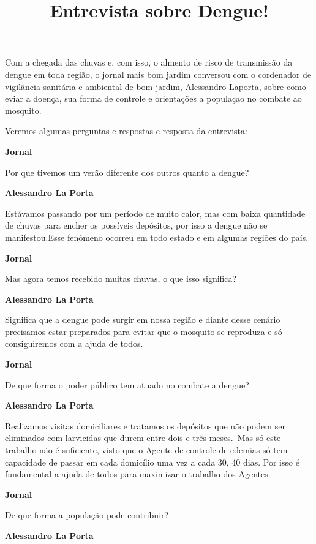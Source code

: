 \documentclass[12pt]{memoir}
\newenvironment{Entrevista}{%
  \par\bigskip\noindent\textbf{Jornal}\par}{%
  \par\smallskip\noindent\textbf{Alessandro La Porta}\par}
\begin{document}
\title{Entrevista sobre Dengue!}
\maketitle

Com a chegada das chuvas e, com isso, o almento de risco de transmissão  da dengue em toda região,  o jornal mais bom jardim conversou com o cordenador de vigilância sanitária e ambiental de bom jardim, Alessandro Laporta, sobre como eviar a doença, sua forma de controle e orientações a populaçao no combate ao mosquito.\\\par
Veremos algumas perguntas e respostas e resposta da entrevista:\\\par


\begin{Entrevista}
Por que tivemos um verão diferente dos outros quanto a dengue?
\end{Entrevista}

Estávamos passando por um período de muito calor, mas com baixa quantidade de chuvas para encher os possíveis depósitos, por isso a dengue não se manifestou.\@ Esse fenômeno ocorreu em todo estado e em algumas regiões do país.

\begin{Entrevista}
Mas agora temos recebido muitas chuvas, o que isso significa?
\end{Entrevista}

Significa que a dengue pode surgir em nossa região e diante desse cenário precisamos estar preparados para evitar que o mosquito se reproduza e só consiguiremos com a ajuda de todos.

\begin{Entrevista}
De que forma o poder público tem atuado no combate a dengue?
\end{Entrevista}

Realizamos visitas domiciliares e tratamos os depósitos que não podem ser eliminados com larvicidas que durem entre dois e três meses.\ Mas só este trabalho não é suficiente, visto que o Agente de controle de edemias só tem capacidade de passar em cada domicílio uma vez a cada 30, 40 dias. Por isso é fundamental a ajuda de todos para maximizar o trabalho dos Agentes.

\begin{Entrevista}
De que forma a população pode contribuir?
\end{Entrevista}
\end{document}
